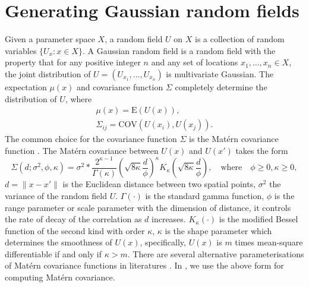 \documentclass[article,nojss]{jss}\usepackage[]{graphicx}\usepackage[]{color}
\def\cov{{\text{COV}}}
\def\E{{\text{E}}}
\begin{document}
\section{Generating Gaussian random fields} 
Given a parameter space $X$, a random field $U$ on $X$ is a collection of random variables $\{U_x :x\in X\}$. A Gaussian random field is a random field with the property that for any positive integer $n$ and any set of locations $x_1,\dots,x_n \in X$, the joint distribution of $U=(U_{x_1},\dots,U_{x_n})$ is multivariate Gaussian. %
The expectation $\mu(x)$ and covariance function $\Sigma$ completely determine the distribution of $U$, where 
\begin{gather*} 
\mu(x) = \E (U(x)),\\
\Sigma_{ij} = \cov (U(x_i),U(x_j)).
\end{gather*}
The common choice for the covariance function $\Sigma$ is the Mat\'ern covariance function \citep{matern1960spatial}. The Mat\'ern covariance between $U(x)$ and $U(x')$ takes the form 
\begin{equation*}
\Sigma(d;\sigma^2,\phi,\kappa)=\sigma^2*\frac{2^{\kappa-1}}{\Gamma(\kappa)} (\sqrt{8\kappa} \frac{d}{\phi})^\kappa  K_\kappa(\sqrt{8\kappa}  \frac{d}{\phi}),  \quad \text{where} \quad \phi 	\geq 0,  \kappa 	\geq 0,
\end{equation*} 
$d =\|x-x'\|$ is the Euclidean distance between two spatial points, 
$\sigma^2$ the variance of the random field $U$.
$\Gamma(\cdot)$ is the standard gamma function,  $\phi$ is the range parameter or scale parameter with the dimension of distance, it controls the rate of decay of the correlation as $d$ increases. $K_\kappa(\cdot)$ is the modified Bessel function of the second kind with order $\kappa$, $\kappa$ is the shape parameter which determines the smoothness of $U(x)$, specifically, $U(x)$ is $m$ times mean-square differentiable if and only if $\kappa > m$. %
There are several alternative parameterisations of Mat\'ern covariance functions in literatures  \citep[see][]{haskard2007anisotropic}. In , we use the above form for computing Mat\'ern covariance.
\end{document}
